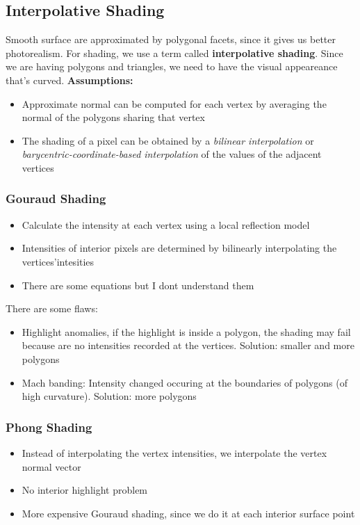 \documentclass[11pt]{article}
\begin{document}
\subsection{Interpolative Shading}
Smooth surface are approximated by polygonal facets, since it gives us better photorealism. For shading, we use a term called \textbf{interpolative shading}. Since we are having polygons and triangles, we need to have the visual appeareance that's curved. 
\newline\noindent
\textbf{Assumptions:}
\begin{itemize}
    \item Approximate normal can be computed for each vertex by averaging the normal of the polygons sharing that vertex
    \item The shading of a pixel can be obtained by a \textit{bilinear interpolation} or \textit{barycentric-coordinate-based interpolation} of the values of the adjacent vertices  
\end{itemize}

\subsubsection*{Gouraud Shading}
\begin{itemize}
    \item Calculate the intensity at each vertex using a local reflection model
    \item Intensities of interior pixels are determined by bilinearly interpolating the vertices'intesities
    \item There are some equations but I dont understand them %
\end{itemize}

There are some flaws: \begin{itemize}
    \item Highlight anomalies, if the highlight is inside a polygon, the shading may fail because are no intensities recorded at the vertices. Solution: smaller and more polygons
    \item Mach banding: Intensity changed occuring at the boundaries of polygons (of high curvature). Solution: more polygons
\end{itemize}

\subsubsection*{Phong Shading}
 \begin{itemize}
    \item Instead of interpolating the vertex intensities, we interpolate the vertex normal vector
    \item No interior highlight problem
    \item More expensive Gouraud shading, since we do it at each interior surface point
 \end{itemize}
\end{document}
